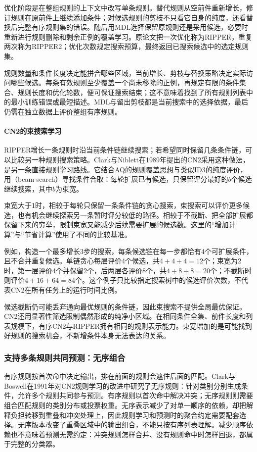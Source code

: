 优化阶段是在整组规则的上下文中改写单条规则。替代规则从空前件重新增长，修订规则在原前件上继续添加条件；对候选规则的剪枝不只看它自身的纯度，还看替换后完整有序规则集的错误。随后用MDL选择保留原规则还是采用候选，必要时重新进行规则删除和剩余正例的覆盖学习。原论文把一次优化称为RIPPER，重复两次称为RIPPER2；优化次数规定搜索预算，最终返回已搜索候选中的选定规则集。

\label{sec:classification-ripper-theory}规则数量和条件长度决定能拼合哪些区域，当前增长、剪枝与替换策略决定实际访问哪些候选。每条有效规则至少覆盖一个尚未移除的正例，再规定有限的条件集合、规则长度和优化轮数，便可保证搜索结束；这不意味着找到了所有规则列表中的最小训练错误或最短描述。MDL与留出剪枝都是当前搜索中的选择依据，最后仍需在独立数据上评价整组有序规则。

\paragraph{CN2的束搜索学习}
RIPPER增长一条规则时沿当前条件链继续搜索；若希望同时保留几条条件链，可以比较另一种规则搜索策略。Clark与Niblett在1989年提出的CN2采用这种做法，是另一条直接规则学习路线。它结合AQ的规则覆盖思想与类似ID3的纯度评价，用（beam search）寻找条件合取：每轮扩展已有候选，只保留评分最好的$b$个候选继续搜索，其中$b$为束宽。

束宽大于1时，相较于每轮只保留一条条件链的贪心搜索，束搜索可以评价更多候选，也有机会继续探索另一条暂时评分较低的路径。相较于不截断、把全部扩展都保留下来的穷举，限制束宽又能减少后续需要扩展的候选数。这里的“增加计算”与“节省计算”使用了不同的比较基准。

例如，构造一个最多增长3步的搜索，每条候选链在每一步都恰有4个可扩展条件，且不合并重复候选。单链贪心每层评价4个候选，共$4+4+4=12$个；束宽为2时，第一层评价4个并保留2个，后两层各评价8个，共$4+8+8=20$个；不截断时则评价$4+16+64=84$个。这个例子只比较指定搜索树中的候选评价次数，不代表CN2在所有任务上的运行时间比例。

候选截断仍可能丢弃通向最优规则的条件链，因此束搜索不提供全局最优保证。CN2还用显著性筛选限制偶然形成的纯净小区域。在相同条件全集、前件长度和列表规模下，有序CN2与RIPPER拥有相同的规则表示能力。束宽增加的是可能找到好规则的搜索机会，不新增条件本身无法表达的关系。

\subsubsection{支持多条规则共同预测：无序组合}
\label{sec:classification-cn2-unordered}
有序规则按首次命中决定输出，排在前面的规则会遮住后面的匹配。Clark与Boswell在1991年对CN2规则学习的改进中研究了无序规则：针对类别分别生成条件，允许多个规则共同参与预测。有序规则以首次命中解决冲突；无序规则则需要组合匹配规则的类别分布或投票权重。无序表示减少了对单一顺序的依赖，却把解释负担转移到重叠和冲突处理上，因此规则学习和预测时的聚合约定需要配套选择。无序版本改变了重叠区域中的输出组合，不能只按有序列表理解。减少顺序依赖也不意味着预测无需约定：冲突规则怎样合并、没有规则命中时怎样回退，都属于完整的分类器。

